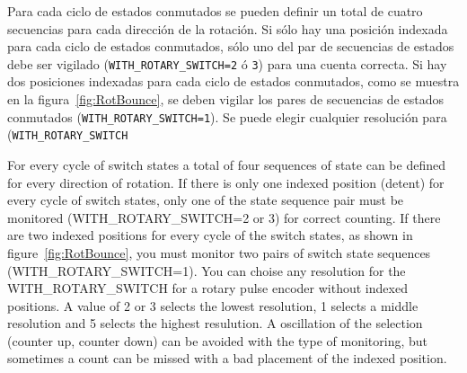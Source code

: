 Para cada  ciclo de  estados conmutados  se pueden  definir un total  de cuatro  secuencias para  cada dirección  de la
rotación. Si sólo hay una posición indexada para cada ciclo de estados conmutados, sólo uno del par de secuencias de
estados  debe  ser vigilado  (\texttt{WITH\_ROTARY\_SWITCH=2}  ó  \texttt{3}) para  una  cuenta  correcta. Si  hay  dos
posiciones indexadas para cada  ciclo de estados conmutados, como se muestra en  la figura~\ref{fig:RotBounce}, se deben
vigilar  los pares  de secuencias  de estados  conmutados (\texttt{WITH\_ROTARY\_SWITCH=1}).  Se puede  elegir cualquier
resolución para (\texttt{WITH\_ROTARY\_SWITCH}


For every cycle of switch states  a total of four sequences of state can be defined  for every direction of rotation. If
there is only one indexed  position (detent) for every cycle of switch states, only one  of the state sequence pair must
be monitored (WITH\_ROTARY\_SWITCH=2 or 3)  for correct counting. If there are two indexed  positions for every cycle of
the  switch states,  as shown  in  figure~\ref{fig:RotBounce}, you  must monitor  two  pairs of  switch state  sequences
(WITH\_ROTARY\_SWITCH=1). You can choise any resolution for  the WITH\_ROTARY\_SWITCH for a rotary pulse encoder without
indexed positions.  A value of 2  or 3 selects the  lowest resolution, 1 selects  a middle resolution and  5 selects the
highest  resulution. A  oscillation  of the  selection  (counter up,  counter down)  can  be avoided  with  the type  of
monitoring, but sometimes a count can be missed with a bad placement of the indexed position.

